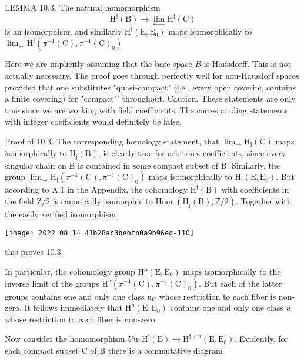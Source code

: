 \documentclass[10pt]{article}
\begin{document}
LEMMA 10.3. The natural homomorphism
$$
\mathrm{H}^{\mathrm{j}}(\mathrm{B}) \rightarrow \lim _{\leftarrow} \mathrm{H}^{\mathrm{j}}(\mathrm{C})
$$
is an isomorphism, and similarly $\mathrm{H}^{\mathrm{j}}\left(\mathrm{E}, \mathrm{E}_{0}\right)$ maps isomorphically to $\lim _{\leftarrow} \mathrm{H}^{\mathrm{j}}\left(\pi^{-1}(\mathrm{C}), \pi^{-1}(\mathrm{C})_{0}\right)$

Here we are implicitly assuming that the base space $B$ is Hausdorff. This is not actually necessary. The proof goes through perfectly well for non-Hausdorf spaces provided that one substitutes "quasi-compact" (i.e., every open covering contains a finite covering) for "compact"' throughout. Caution. These statements are only true since we are working with field coefficients. The corresponding statements with integer coefficients would definitely be false.

Proof of 10.3. The corresponding homology statement, that $\lim _{\rightarrow} \mathrm{H}_{\mathrm{j}}(\mathrm{C})$ maps isomorphically to $\mathrm{H}_{\mathrm{j}}(\mathrm{B})$, is clearly true for arbitrary coefficients, since every singular chain on $\mathrm{B}$ is contained in some compact subset of B. Similarly, the group $\lim _{\rightarrow} \mathrm{H}_{\mathrm{j}}\left(\pi^{-1}(\mathrm{C}), \pi^{-1}(\mathrm{C})_{0}\right)$ maps isomorphically to $\mathrm{H}_{\mathrm{j}}\left(\mathrm{E}, \mathrm{E}_{0}\right)$. But according to $\mathrm{A} .1$ in the Appendix, the cohomology $\mathrm{H}^{\mathrm{j}}(\mathrm{B})$ with coefficients in the field $\mathrm{Z} / 2$ is canonically isomorphic to Hom $\left(\mathrm{H}_{\mathrm{j}}(\mathrm{B}), \mathbb{Z} / 2\right)$. Together with the easily verified isomorphism

\texttt{[image: 2022\_08\_14\_41b28ac3bebfb0a9b96eg-110]}

this proves 10.3.

In particular, the cohomology group $\mathrm{H}^{\mathrm{n}}\left(\mathrm{E}, \mathrm{E}_{0}\right)$ maps isomorphically to the inverse limit of the groups $\mathrm{H}^{\mathrm{n}}\left(\pi^{-1}(\mathrm{C}), \pi^{-1}(\mathrm{C})_{0}\right)$. But each of the latter groups contains one and only one class $\mathrm{u}_{\mathrm{C}}$ whose restriction to each fiber is non-zero. It follows immediately that $\mathrm{H}^{\mathrm{n}}\left(\mathrm{E}, \mathrm{E}_{0}\right)$ contains one and only one class $u$ whose restriction to each fiber is non-zero.

Now consider the homomorphism $U \mathrm{u}: \mathrm{H}^{\mathrm{j}}(\mathrm{E}) \rightarrow \mathrm{H}^{\mathrm{j}+\mathrm{n}}\left(\mathrm{E}, \mathrm{E}_{0}\right)$. Evidently, for each compact subset $\mathrm{C}$ of $\mathrm{B}$ there is a commutative diagram
\end{document}
